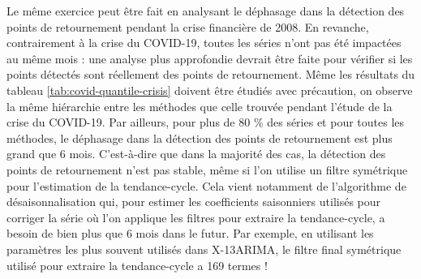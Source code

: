 \documentclass[
  11pt,
  french,
  a4paper]{article}
\newcommand\1{\mathds{1}}
\begin{document}
Le même exercice peut être fait en analysant le déphasage dans la détection des points de retournement pendant la crise financière de 2008.
En revanche, contrairement à la crise du COVID-19, toutes les séries n'ont pas été impactées au même mois : une analyse plus approfondie devrait être faite pour vérifier si les points détectés sont réellement des points de retournement.
Même les résultats du tableau \ref{tab:covid-quantile-crisis} doivent être étudiés avec précaution, on observe la même hiérarchie entre les méthodes que celle trouvée pendant l'étude de la crise du COVID-19.
Par ailleurs, pour plus de 80 \% des séries et pour toutes les méthodes, le déphasage dans la détection des points de retournement est plus grand que 6 mois.
C'est-à-dire que dans la majorité des cas, la détection des points de retournement n'est pas stable, même si l'on utilise un filtre symétrique pour l'estimation de la tendance-cycle.
Cela vient notamment de l'algorithme de désaisonnalisation qui, pour estimer les coefficients saisonniers utilisés pour corriger la série où l'on applique les filtres pour extraire la tendance-cycle, a besoin de bien plus que 6 mois dans le futur.
Par exemple, en utilisant les paramètres les plus souvent utilisés dans X-13ARIMA, le filtre final symétrique utilisé pour extraire la tendance-cycle a 169 termes !
\end{document}
